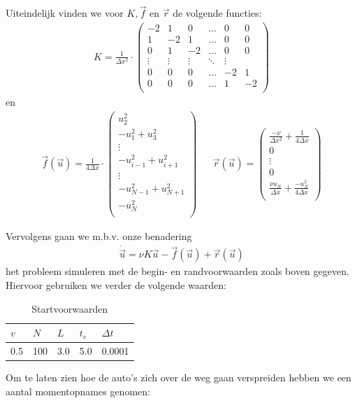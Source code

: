 \documentclass{article}
\newcommand{\Dt}{\Delta t}
\begin{document}
Uiteindelijk vinden we voor \(K,\vec{f}\) en \(\vec{r}\) de volgende functies:
\begin{align*}
K = \frac{1}{\Delta x^2}\cdot\begin{pmatrix}
-2 & 1 & 0 & \hdots & 0 & 0\\
1 & -2 & 1 & \hdots & 0 & 0\\
0 & 1 & -2 & \hdots & 0 & 0\\
\vdots & \vdots & \vdots & \ddots & \vdots\\
0 & 0 & 0 & \hdots & -2 & 1\\
0 & 0 & 0 & \hdots & 1 & -2\\
\end{pmatrix}
\end{align*}
en
\begin{align*}
\vec{f}(\vec{u}) = \frac{1}{4\Delta x}\cdot
\begin{pmatrix}
u_2^2\\
-u_1^2 + u_3^2\\
\vdots\\
-u_{i-1}^2+u_{i+1}^2\\
\vdots\\
-u_{N-1}^2+u_{N+1}^2\\
-u_N^2\\
\end{pmatrix}
&&
\vec{r}(\vec{u}) = 
\begin{pmatrix}
\frac{-\nu}{\Delta x^2} + \frac{1}{4\Delta x}\\
0\\
\vdots\\
0\\
\frac{\nu u_N}{\Delta x} + \frac{-u_N^2}{4\Delta x}\\
\end{pmatrix}
\end{align*}

Vervolgens gaan we m.b.v. onze benadering 
\begin{align*}
\dot{\vec{u}} = \nu K \vec{u} - \vec{f}(\vec{u})+\vec{r}(\vec{u})
\end{align*}
het probleem simuleren met de begin- en randvoorwaarden zoals boven gegeven.
Hiervoor gebruiken we verder de volgende waarden:
\begin{table}[H]
\centering
\label{tab:specs}
\begin{tabular}{|l|l|l|l|l|}
\hline
\(v\) & \(N\) & \(L\) & \(t_e\) & \(\Dt\) \\ \hline
 0.5 & 100 & 3.0 & 5.0 & 0.0001 \\ \hline
\end{tabular}
\caption{Startvoorwaarden}
\end{table}
\newpage
Om te laten zien hoe de auto's zich over de weg gaan verspreiden hebben we een aantal momentopnames genomen:
\end{document}
